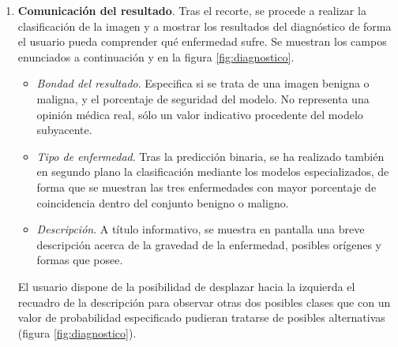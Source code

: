 \begin{enumerate}
 	\item \textbf {Comunicación del resultado}. Tras el recorte, se procede a realizar la clasificación de la imagen y a mostrar los resultados del diagnóstico de forma el usuario pueda comprender qué enfermedad sufre. Se muestran los campos enunciados a continuación y en la figura \ref{fig:diagnostico}.
 	\begin{itemize}
 		\item \textit{Bondad del resultado}. Especifica si se trata de una imagen benigna o maligna, y el porcentaje de seguridad del modelo. No representa una opinión médica real, sólo un valor indicativo procedente del modelo subyacente.
 		\item \textit{Tipo de enfermedad}. Tras la predicción binaria, se ha realizado también en segundo plano la clasificación mediante los modelos especializados, de forma que se muestran las tres enfermedades con mayor porcentaje de coincidencia dentro del conjunto benigno o maligno.
 		\item \textit{Descripción}. A título informativo, se muestra en pantalla una breve descripción acerca de la gravedad de la enfermedad, posibles orígenes y formas que posee.
 	\end{itemize}
 	
 	El usuario dispone de la posibilidad de desplazar hacia la izquierda el recuadro de la descripción para observar otras dos posibles clases que con un valor de probabilidad especificado pudieran tratarse de posibles alternativas (figura \ref{fig:diagnostico}).
 \end{enumerate}
 
